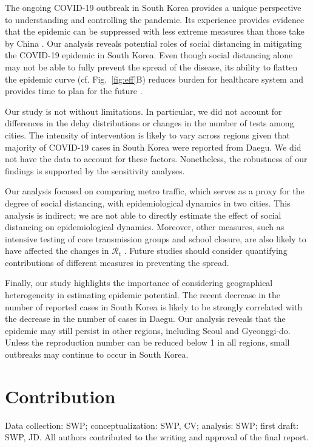 \documentclass[12pt]{article}
\newcommand{\fref}[1]{Fig.~\ref{fig:#1}}
\begin{document}
The ongoing COVID-19 outbreak in South Korea provides a unique perspective to understanding and controlling the pandemic.
Its experience provides evidence that the epidemic can be suppressed with less extreme measures than those take by China \citep{kickbusch2020response}.
Our analysis reveals potential roles of social distancing in mitigating the COVID-19 epidemic in South Korea.
Even though social distancing alone may not be able to fully prevent the spread of the disease, its ability to flatten the epidemic curve (cf. \fref{eff}B) reduces burden for healthcare system and provides time to plan for the future \citep{anderson2020will}.

Our study is not without limitations.
In particular, we did not account for differences in the delay distributions or changes in the number of tests among cities.
The intensity of intervention is likely to vary across regions given that majority of COVID-19 cases in South Korea were reported from Daegu.
We did not have the data to account for these factors.
Nonetheless, the robustness of our findings is supported by the sensitivity analyses.

Our analysis focused on comparing metro traffic, which serves as a proxy for the degree of social distancing, with epidemiological dynamics in two cities.
This analysis is indirect; we are not able to directly estimate the effect of social distancing on epidemiological dynamics.
Moreover, other measures, such as intensive testing of core transmission groups and school closure, are also likely to have affected the changes in $\mathcal R_t$ \citep{kcdc}.
Future studies should consider quantifying contributions of different measures in preventing the spread.

Finally, our study highlights the importance of considering geographical heterogeneity in estimating epidemic potential.
The recent decrease in the number of reported cases in South Korea is likely to be strongly correlated with the decrease in the number of cases in Daegu.
Our analysis reveals that the epidemic may still persist in other regions, including Seoul and Gyeonggi-do.
Unless the reproduction number can be reduced below 1 in all regions, small outbreaks may continue to occur in South Korea.

\section*{Contribution}

Data collection: SWP; conceptualization: SWP, CV; analysis: SWP; first draft: SWP, JD. All authors contributed to the writing and approval of the final report.
\end{document}
